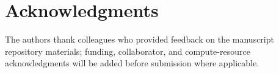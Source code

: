 \section*{Acknowledgments}

The authors thank colleagues who provided feedback on the manuscript repository materials; funding, collaborator, and compute-resource acknowledgments will be added before submission where applicable.
